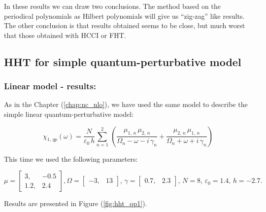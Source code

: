 \documentclass[12pt,twoside,a4paper]{article}
\numberwithin{equation}{subsection}
\numberwithin{figure}{subsection}
\begin{document}
In these results we can draw two conclusions. The method based on the periodical polynomials as Hilbert polynomials will
give us ``zig-zag'' like results. The other conclusion is that results obtained seems to be close, but much worst that those
obtained with HCCI or FHT. 

\subsection{HHT for simple quantum-perturbative model} \label{chap:hermite_quantum}

\subsubsection*{Linear model - results:}

As in the Chapter (\ref{chap:nc_nlo}), we have used the same model to describe the simple linear quantum-perturbative model: 

\begin{equation} \label{eq:hht_qp}
  {\chi_{1, \,qp}}(\omega ) = \frac {N}{\varepsilon_0\,h} \sum_{n=1}^{2}\,(\frac {{\mu_{1, \,n}}\,{ \mu_{2, \,n}}}{{\Omega_{n}}
  - \omega  - i\,{\gamma_{n}}} + \frac {{\mu_{2, \,n}}\,{\mu_{1, \,n}}}{{\Omega_{n}} + \omega + i\,{\gamma_{n}}})
\end{equation}

This time we used the following parameters: 

\begin{equation}
  \mu = \begin{bmatrix} 
    3,   & - 0.5 \\ 
    1.2, &   2.4
  \end{bmatrix},
  \Omega = \begin{bmatrix} 
    - 3, & 13
  \end{bmatrix}, \,
  \gamma = \begin{bmatrix} 
    0.7, & 2.3
  \end{bmatrix}, \,
  N = 8, \,
  \varepsilon_{0} = 1.4, \,
  h = - 2.7.
\end{equation} 

Results are presented in Figure (\ref{fig:hht_qp1}). 
\end{document}
